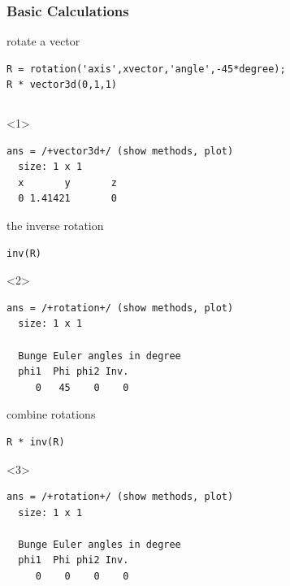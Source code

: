 \documentclass[compress]{beamer}
\begin{document}
\begin{frame}[fragile]
  \frametitle{Basic Calculations}

    rotate a vector
    \begin{lstlisting}[style=input]
R = rotation('axis',xvector,'angle',-45*degree);
R * vector3d(0,1,1)
    \end{lstlisting}


  \begin{columns}
    \begin{column}{8cm}
  \begin{overlayarea}{8cm}{8cm}
\begin{onlyenv}<1>
  \vspace{-0.3cm}
\begin{lstlisting}[style=output]
ans = /+vector3d+/ (show methods, plot)
  size: 1 x 1
  x       y       z
  0 1.41421       0
  \end{lstlisting}
\end{onlyenv}

\pause
 \medskip

 the inverse rotation
 \begin{lstlisting}[style=input]
 inv(R)
 \end{lstlisting}
 \begin{onlyenv}<2>
   \vspace{-0.3cm}
  \begin{lstlisting}[style=output]
ans = /+rotation+/ (show methods, plot)
  size: 1 x 1

  Bunge Euler angles in degree
  phi1  Phi phi2 Inv.
     0   45    0    0
  \end{lstlisting}
 \end{onlyenv}

 \pause
 \medskip

 combine rotations
 \begin{lstlisting}[style=input]
R * inv(R)
\end{lstlisting}

\begin{onlyenv}<3>
  \vspace{-0.3cm}
  \begin{lstlisting}[style=output]
ans = /+rotation+/ (show methods, plot)
  size: 1 x 1

  Bunge Euler angles in degree
  phi1  Phi phi2 Inv.
     0    0    0    0
  \end{lstlisting}
\end{onlyenv}

\pause
\medskip


\end{overlayarea}
\end{column}
\end{columns}
\end{frame}
\end{document}
